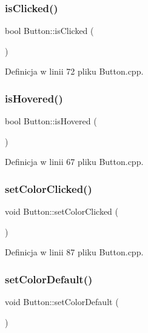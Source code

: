 \subsubsection{\texorpdfstring{is\+Clicked()}{isClicked()}}
{\footnotesize\ttfamily bool Button\+::is\+Clicked (\begin{DoxyParamCaption}{ }\end{DoxyParamCaption})}



Definicja w linii 72 pliku Button.\+cpp.

\mbox{\label{class_button_a70c28ee3bec38814f77e6606e2da19ef}} 
\subsubsection{\texorpdfstring{is\+Hovered()}{isHovered()}}
{\footnotesize\ttfamily bool Button\+::is\+Hovered (\begin{DoxyParamCaption}{ }\end{DoxyParamCaption})}



Definicja w linii 67 pliku Button.\+cpp.

\mbox{\label{class_button_acbc078483f6c6a6c75b7ff00cf07dd05}} 
\subsubsection{\texorpdfstring{set\+Color\+Clicked()}{setColorClicked()}}
{\footnotesize\ttfamily void Button\+::set\+Color\+Clicked (\begin{DoxyParamCaption}{ }\end{DoxyParamCaption})}



Definicja w linii 87 pliku Button.\+cpp.

\mbox{\label{class_button_a1a41668f07d7c7b03f05ab6602aa83e7}} 
\subsubsection{\texorpdfstring{set\+Color\+Default()}{setColorDefault()}}
{\footnotesize\ttfamily void Button\+::set\+Color\+Default (\begin{DoxyParamCaption}{ }\end{DoxyParamCaption})}



